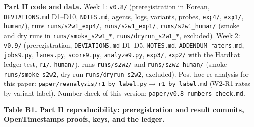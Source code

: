 \documentclass[10pt]{article}
\begin{document}
\begin{itemize}
  \textbf{Part II code and data.} Week 1: \texttt{v0.\allowbreak{}8/\allowbreak{}} (preregistration in Korean, \texttt{DEVIATIONS.\allowbreak{}md} D1--D10, \texttt{NOTES.\allowbreak{}md}, agents, logs, variants, probes, \texttt{exp4/\allowbreak{}}, \texttt{exp1/\allowbreak{}}, \texttt{human/\allowbreak{}}), runs \texttt{runs/\allowbreak{}s2w1\_\allowbreak{}exp4/\allowbreak{}}, \texttt{runs/\allowbreak{}s2w1\_\allowbreak{}exp1/\allowbreak{}}, \texttt{runs/\allowbreak{}s2w1\_\allowbreak{}human/\allowbreak{}} (smoke and dry runs in \texttt{runs/\allowbreak{}smoke\_\allowbreak{}s2w1\_\allowbreak{}*}, \texttt{runs/\allowbreak{}dryrun\_\allowbreak{}s2w1\_\allowbreak{}*}, excluded). Week 2: \texttt{v0.\allowbreak{}9/\allowbreak{}} (preregistration, \texttt{DEVIATIONS.\allowbreak{}md} D1--D5, \texttt{NOTES.\allowbreak{}md}, \texttt{ADDENDUM\_\allowbreak{}raters.\allowbreak{}md}, \texttt{jobs9.\allowbreak{}py}, \texttt{lanes.\allowbreak{}py}, \texttt{score9.\allowbreak{}py}, \texttt{analyze9.\allowbreak{}py}, \texttt{exp3/\allowbreak{}}, \texttt{exp2/\allowbreak{}} with the Hardhat ledger test, \texttt{r1/\allowbreak{}}, \texttt{human/\allowbreak{}}), runs \texttt{runs/\allowbreak{}s2w2/\allowbreak{}} and \texttt{runs/\allowbreak{}s2w2\_\allowbreak{}human/\allowbreak{}} (smoke \texttt{runs/\allowbreak{}smoke\_\allowbreak{}s2w2}, dry run \texttt{runs/\allowbreak{}dryrun\_\allowbreak{}s2w2}, excluded). Post-hoc re-analysis for this paper: \texttt{paper/\allowbreak{}reanalysis/\allowbreak{}r1\_\allowbreak{}by\_\allowbreak{}label.\allowbreak{}py} → \texttt{r1\_\allowbreak{}by\_\allowbreak{}label.\allowbreak{}md} (W2-R1 rates by variant label). Number check of this version: \texttt{paper/\allowbreak{}v0.\allowbreak{}8\_\allowbreak{}numbers\_\allowbreak{}check.\allowbreak{}md}.
\end{itemize}

\textbf{Table B1. Part II reproducibility: preregistration and result commits, OpenTimestamps proofs, keys, and the ledger.}
\end{document}
